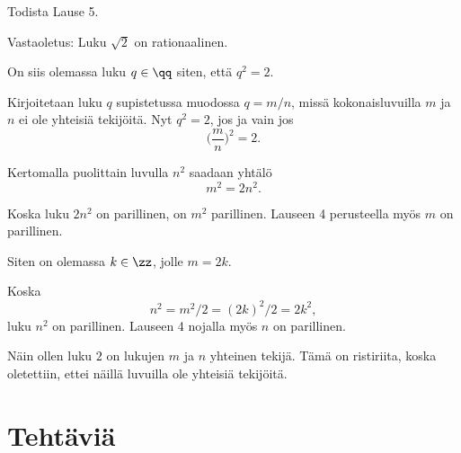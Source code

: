 \begin{esimerkki}
	Todista Lause 5.

	\begin{todistus}
		Vastaoletus: Luku $\sqrt{2}$ on rationaalinen.

		On siis olemassa luku $q\in \qq$ siten, että $q^2=2$.

		Kirjoitetaan luku $q$ supistetussa muodossa $q=m/n$, missä kokonaisluvuilla
		$m$ ja $n$ ei ole yhteisiä tekijöitä. 
		Nyt $q^2=2$, jos ja vain jos
		\[
			\bigg(\frac{m}{n}\bigg)^2=2.
		\]

		Kertomalla puolittain luvulla $n^2$ saadaan yhtälö
		\[
			m^2 = 2n^2.
		\]

		Koska luku $2n^2$ on parillinen, on $m^2$ parillinen. Lauseen 4 perusteella myös $m$ on parillinen.

		Siten on olemassa $k\in \zz$, jolle $m=2k$.

		Koska
		\[
			n^2=m^2/2=(2k)^2/2= 2k^2,
		\]
		luku $n^2$ on parillinen. Lauseen 4 nojalla myös $n$ on parillinen.

		Näin ollen luku $2$ on lukujen $m$ ja $n$ yhteinen tekijä. Tämä on ristiriita,
		koska oletettiin, ettei näillä luvuilla ole yhteisiä tekijöitä.
	\end{todistus}
\end{esimerkki}

\newpage
\section*{Tehtäviä}

